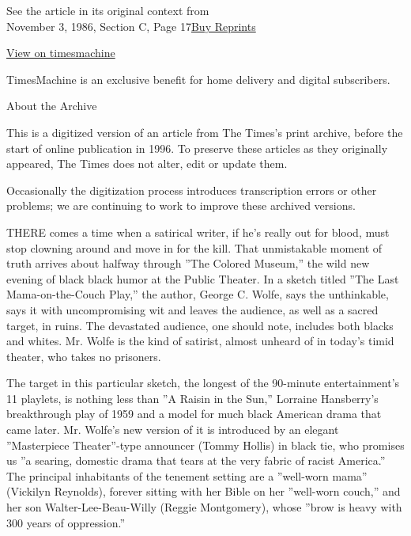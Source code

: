 See the article in its original context from\\
November 3, 1986, Section C, Page
17\href{https://store.nytimes3xbfgragh.onion/collections/new-york-times-page-reprints?utm_source=nytimes\&utm_medium=article-page\&utm_campaign=reprints}{Buy
Reprints}

\href{http://timesmachine.nytimes3xbfgragh.onion/timesmachine/1986/11/03/815086.html}{View
on timesmachine}

TimesMachine is an exclusive benefit for home delivery and digital
subscribers.

About the Archive

This is a digitized version of an article from The Times's print
archive, before the start of online publication in 1996. To preserve
these articles as they originally appeared, The Times does not alter,
edit or update them.

Occasionally the digitization process introduces transcription errors or
other problems; we are continuing to work to improve these archived
versions.

THERE comes a time when a satirical writer, if he's really out for
blood, must stop clowning around and move in for the kill. That
unmistakable moment of truth arrives about halfway through ''The Colored
Museum,'' the wild new evening of black black humor at the Public
Theater. In a sketch titled ''The Last Mama-on-the-Couch Play,'' the
author, George C. Wolfe, says the unthinkable, says it with
uncompromising wit and leaves the audience, as well as a sacred target,
in ruins. The devastated audience, one should note, includes both blacks
and whites. Mr. Wolfe is the kind of satirist, almost unheard of in
today's timid theater, who takes no prisoners.

The target in this particular sketch, the longest of the 90-minute
entertainment's 11 playlets, is nothing less than ''A Raisin in the
Sun,'' Lorraine Hansberry's breakthrough play of 1959 and a model for
much black American drama that came later. Mr. Wolfe's new version of it
is introduced by an elegant ''Masterpiece Theater''-type announcer
(Tommy Hollis) in black tie, who promises us ''a searing, domestic drama
that tears at the very fabric of racist America.'' The principal
inhabitants of the tenement setting are a ''well-worn mama'' (Vickilyn
Reynolds), forever sitting with her Bible on her ''well-worn couch,''
and her son Walter-Lee-Beau-Willy (Reggie Montgomery), whose ''brow is
heavy with 300 years of oppression.''

